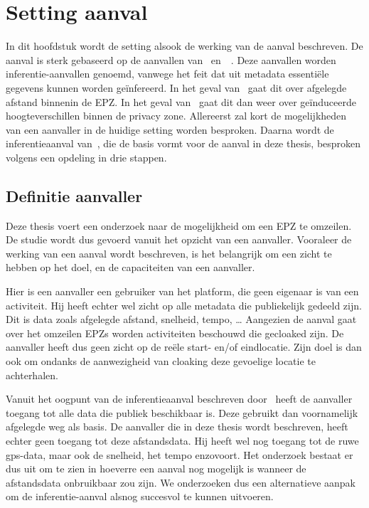 
\chapter{Setting aanval}\label{chap:inferentieaanval}
In dit hoofdstuk wordt de setting alsook de werking van de aanval beschreven.
De aanval is sterk gebaseerd op de aanvallen van~\citeauthor{Dhondt}
en~\citeauthor{Verdonck_2022}~\cite{Verdonck_2022, Dhondt}. Deze aanvallen
worden inferentie-aanvallen genoemd, vanwege het feit dat uit metadata
essentiële gegevens kunnen worden geïnfereerd. In het geval
van~\citeauthor{Dhondt} gaat dit over afgelegde afstand binnenin de \ac{EPZ}.
In het geval van~\citeauthor{Verdonck_2022} gaat dit dan weer over geïnduceerde
hoogteverschillen binnen de privacy zone. Allereerst zal kort de mogelijkheden
van een aanvaller in de huidige setting worden besproken. Daarna wordt de
inferentieaanval van~\citeauthor{Dhondt}, die de basis vormt voor de aanval in
deze thesis, besproken volgens een opdeling in drie stappen.

\section{Definitie aanvaller}\label{sec:definitie-aanvaller}
Deze thesis voert een onderzoek naar de mogelijkheid om een \ac{EPZ} te
omzeilen. De studie wordt dus gevoerd vanuit het opzicht van een aanvaller.
Vooraleer de werking van een aanval wordt beschreven, is het belangrijk om een
zicht te hebben op het doel, en de capaciteiten van een aanvaller.

Hier is een aanvaller een gebruiker van het platform, die geen eigenaar is van
een activiteit. Hij heeft echter wel zicht op alle metadata die publiekelijk
gedeeld zijn. Dit is data zoals afgelegde afstand, snelheid, tempo, \ldots
Aangezien de aanval gaat over het omzeilen \acp{EPZ} worden activiteiten
beschouwd die gecloaked zijn. De aanvaller heeft dus geen zicht op de reële
start- en/of eindlocatie. Zijn doel is dan ook om ondanks de aanwezigheid van
cloaking deze gevoelige locatie te achterhalen.

Vanuit het oogpunt van de inferentieaanval beschreven door~\citeauthor{Dhondt}
heeft de aanvaller toegang tot alle data die publiek beschikbaar is. Deze
gebruikt dan voornamelijk afgelegde weg als basis. De aanvaller die in deze
thesis wordt beschreven, heeft echter geen toegang tot deze afstandsdata. Hij
heeft wel nog toegang tot de ruwe gps-data, maar ook de snelheid, het tempo
enzovoort. Het onderzoek bestaat er dus uit om te zien in hoeverre een aanval
nog mogelijk is wanneer de afstandsdata onbruikbaar zou zijn. We onderzoeken
dus een alternatieve aanpak om de inferentie-aanval alsnog succesvol te kunnen
uitvoeren.

